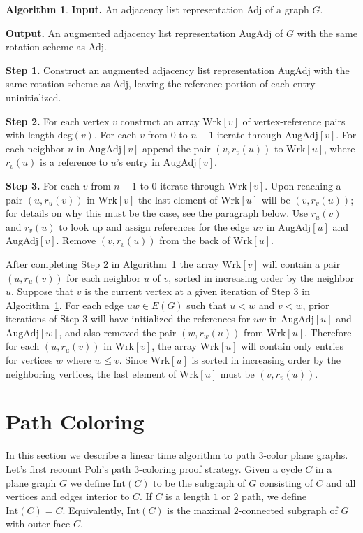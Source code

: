 \documentclass[12pt,letterpaper]{article}
\theoremstyle{plain}
\theoremstyle{definition}
\theoremstyle{break}
\newtheorem{algorithm}[lemma]{Algorithm}     %
\begin{document}
\begin{algorithm}\label{A:augment}
\textbf{Input.} An adjacency list representation Adj of a graph $G$.

\textbf{Output.} An augmented adjacency list representation AugAdj of
$G$ with the same rotation scheme as Adj.

\textbf{Step 1.} Construct an augmented adjacency list representation AugAdj
with the same rotation scheme as Adj, leaving the reference portion of each
entry uninitialized.

\textbf{Step 2.} For each vertex $v$ construct an array $\text{Wrk}[v]$
of vertex-reference pairs with length $\text{deg}(v)$. For each $v$ from
$0$ to $n-1$ iterate through
$\text{AugAdj}[v]$. For each neighbor $u$ in $\text{AugAdj}[v]$ append the pair
$(v,r_v(u))$ to
$\text{Wrk}[u]$, where $r_v(u)$ is a reference to $u$'s entry in
$\text{AugAdj}[v]$.

\textbf{Step 3.} For each $v$ from $n-1$ to $0$ iterate through
$\text{Wrk}[v]$. Upon reaching a pair $(u,r_u(v))$ in $\text{Wrk}[v]$ the
last element of $\text{Wrk}[u]$ will be $(v,r_v(u))$; for details on why this
must be the case, see the paragraph below. Use
$r_u(v)$ and $r_v(u)$ to look up and assign references for the edge $uv$ in
AugAdj$[u]$ and AugAdj$[v]$. Remove $(v,r_v(u))$ from the back of
$\text{Wrk}[u]$.
\end{algorithm}

After completing Step $2$ in Algorithm~\ref{A:augment} the array $\text{Wrk}[v]$
will contain
a pair $(u,r_u(v))$ for each neighbor $u$ of $v$, sorted in increasing order by
the neighbor $u$.
Suppose that $v$ is the current vertex at a given iteration of Step $3$ in
Algorithm~\ref{A:augment}. For each edge $uw\in E(G)$ such that
$u<w$ and $v<w$, prior iterations of Step 3 will have initialized the
references for $uw$ in $\text{AugAdj}[u]$ and $\text{AugAdj}[w]$, and also
removed the pair
$(w,r_w(u))$ from $\text{Wrk}[u]$. Therefore for each $(u,r_u(v))$ in
$\text{Wrk}[v]$, the array $\text{Wrk}[u]$ will contain only entries for
vertices $w$ where $w\le v$. Since $\text{Wrk}[u]$ is sorted in
increasing order by the neighboring vertices, the last element of
$\text{Wrk}[u]$ must be $(v,r_v(u))$.

\section{Path Coloring}

In this section we describe a linear time algorithm to path $3$-color
plane graphs. Let's first recount Poh's path $3$-coloring proof strategy.
Given a cycle $C$ in a plane graph $G$ we define $\text{Int}(C)$ to
be the subgraph of $G$ consisting of $C$ and all vertices and edges interior to
$C$. If $C$ is a length $1$ or $2$ path, we define $\text{Int}(C)=C$.
Equivalently, $\text{Int}(C)$ is the maximal $2$-connected subgraph of $G$ with
outer face $C$.
\end{document}
